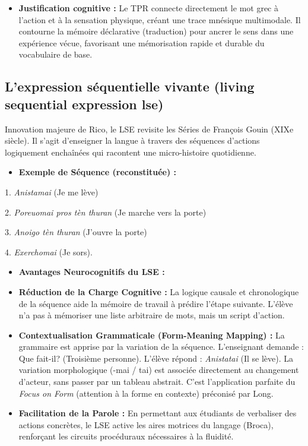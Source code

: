\begin{itemize}\item \textbf{Justification cognitive :} Le TPR connecte directement le mot grec à l'action et à la sensation physique, créant une trace mnésique multimodale. Il contourne la mémoire déclarative (traduction) pour ancrer le sens dans une expérience vécue, favorisant une mémorisation rapide et durable du vocabulaire de base.\cite{II-3-3-ref53}\end{itemize}

\subsection{L'expression séquentielle vivante (living sequential expression \- lse)}

Innovation majeure de Rico, le LSE revisite les \og Séries\fg{} de François Gouin (XIXe siècle). Il
s'agit d'enseigner la langue à travers des séquences d'actions logiquement enchaînées qui racontent
une micro-histoire quotidienne.\cite{II-3-3-ref50}

\begin{itemize}\item \textbf{Exemple de Séquence (reconstituée) :}\end{itemize}1. \textit{Anistamai} (Je me lève)

2. \textit{Poreuomai pros tèn thuran} (Je marche vers la porte)

3. \textit{Anoigo tèn thuran} (J'ouvre la porte)

4. \textit{Exerchomai} (Je sors).\cite{II-3-3-ref55}

\begin{itemize}\item \textbf{Avantages Neurocognitifs du LSE :}\item \textbf{Réduction de la Charge Cognitive :} La logique causale et chronologique de la séquence aide la mémoire de travail à prédire l'étape suivante. L'élève n'a pas à mémoriser une liste arbitraire de mots, mais un \og script\fg{} d'action.\cite{II-3-3-ref57}\item \textbf{Contextualisation Grammaticale (Form-Meaning Mapping) :} La grammaire est apprise par la variation de la séquence. L'enseignant demande : \og Que fait-il?\fg{} (Troisième personne). L'élève répond : \textit{\og Anistatai\fg{}} (Il se lève). La variation morphologique (-mai / \-tai) est associée directement au changement d'acteur, sans passer par un tableau abstrait. C'est l'application parfaite du \textit{Focus on Form} (attention à la forme en contexte) préconisé par Long.\cite{II-3-3-ref54}\item \textbf{Facilitation de la Parole :} En permettant aux étudiants de verbaliser des actions concrètes, le LSE active les aires motrices du langage (Broca), renforçant les circuits procéduraux nécessaires à la fluidité.\cite{II-3-3-ref58}\end{itemize}

